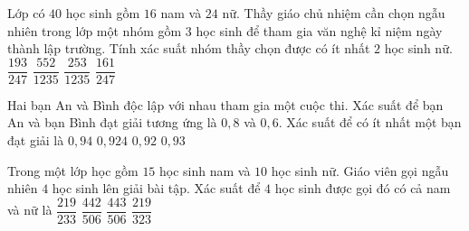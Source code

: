 \begin{ex}%
	Lớp có $40$ học sinh gồm $16$ nam và $24$ nữ. Thầy giáo chủ nhiệm cần chọn ngẫu nhiên trong lớp một nhóm gồm $3$ học sinh để tham gia văn nghệ kỉ niệm ngày thành lập  trường. Tính xác suất nhóm thầy chọn được có ít nhất $2$ học sinh nữ.
	 \choice
		 {$\dfrac{193}{247}$}
		{$\dfrac{552}{1235}$} 
		{$\dfrac{253}{1235}$} 
		{\True  $\dfrac{161}{247}$}
\end{ex}

\begin{ex}%
	Hai bạn An và Bình độc lập với nhau tham gia một cuộc thi. Xác suất để bạn An và bạn Bình đạt giải tương ứng là $0{,}8$ và $0{,}6$. Xác suất để có ít nhất một bạn đạt giải  là
	 \choice
		{$0{,}94$} 
		 {$0{,}924$}
		 {\True $0{,}92$}
		{$0{,}93$} 
\end{ex}

\begin{ex}%
	Trong một lớp học gồm $15$ học sinh  nam và $10$ học sinh nữ. Giáo viên gọi ngẫu nhiên $4$ học sinh lên giải bài tập. Xác suất để $4$ học sinh được gọi đó có cả nam và nữ là
	\choice 
		{$\dfrac{219}{233}$} 
		 {$\dfrac{442}{506}$}
		{\True $\dfrac{443}{506}$} 
		{$\dfrac{219}{323}$} 
\end{ex}


